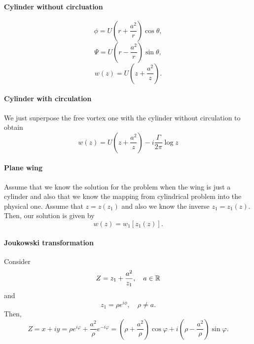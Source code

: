 \documentclass[11pt,oneside]{book}
\theoremstyle{definition} %
\theoremstyle{plain} %
\theoremstyle{remark} %
\theoremstyle{underline}
\begin{document}
  \paragraph{Cylinder without circluation}
  \begin{displaymath}
    \phi= U \left(r + \frac{a^2}{r}\right) \cos \theta,
  \end{displaymath}
  \begin{displaymath}
    \Psi = U\left( r - \frac{a^2}{r}\right) \sin \theta,
  \end{displaymath}
  \begin{displaymath}
    w(z) = U\left( z + \frac{a^2}{z} \right).
  \end{displaymath}
  
  \paragraph{Cylinder with circulation}
  We just superpose the free vortex one with the cylinder without circulation to obtain
  \begin{displaymath}
    w(z) = U \left( z + \frac{a^2}{z} \right) - i \frac{\Gamma}{2 \pi }\log z
  \end{displaymath}
  
  \paragraph{Plane wing}

  Assume that we know the solution for the problem when the wing is just a cylinder
  and also that we know the mapping from cylindrical problem into the physical one.
  Assume that $z = z(z_1)$ and also we know the inverse $z_1 = z_1(z)$.
  Then, our solution is given by
  \begin{displaymath}
    w(z) = w_1[z_1(z)].
  \end{displaymath}
  
  \paragraph{Joukowski transformation}
  Consider
  \begin{displaymath}
    Z = z_1 + \frac{a^2}{z_1}, \quad a \in \mathbb{R}
  \end{displaymath}
  and
  \begin{displaymath}
    z_1 = \rho e^{i \phi}, \quad \rho \neq a.
  \end{displaymath}
  Then,
  \begin{displaymath}
    Z = x + iy 
    = \rho e^{i \varphi} + \frac{a^2}{\rho} e^{-i \varphi} 
    = \left( \rho + \frac{a^2}{\rho} \right) \cos \varphi + i\left( \rho - \frac{a^2}{\rho} \right) \sin \varphi.
  \end{displaymath}
  
\end{document}
